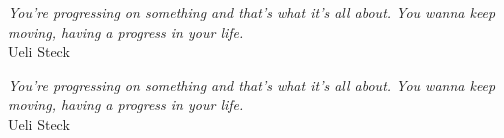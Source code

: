 \thispagestyle{empty}
\vspace*{\fill}
\emph{
    You're progressing on something and that's what it's all about. You wanna keep moving, having a progress in your life.\\
}
\hfill Ueli Steck

\vspace{4cm}

\emph{
    You're progressing on something and that's what it's all about. You wanna keep moving, having a progress in your life.\\
}
\hfill Ueli Steck
\vspace*{\fill}


